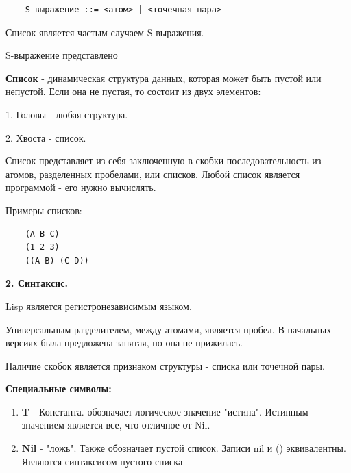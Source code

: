 \begin{lstlisting}
	S-выражение ::= <атом> | <точечная пара>
\end{lstlisting}

Список является частым случаем S-выражения.

S-выражение представлено 

\begin{figure}[ht!]
\end{figure}

\textbf{Список} - динамическая структура данных, которая может быть
пустой или непустой. Если она не пустая, то состоит из двух элементов:

1. Головы - любая структура.

2. Хвоста - список.

Список представляет из себя заключенную в скобки
последовательность из атомов, разделенных пробелами, или списков.
Любой список является программой - его нужно вычислять.

Примеры списков:
\begin{lstlisting}
	(A B C)
	(1 2 3)
	((A B) (C D))
\end{lstlisting}

\textbf{2. Синтаксис.}

Lisp является регистронезависимым языком. 

Универсальным разделителем, между атомами, является пробел. В начальных версиях была предложена запятая, но она не прижилась.

Наличие скобок является признаком структуры - списка или точечной пары.

\textbf{Специальные символы:}
\begin{enumerate}
	\item \textbf{T} - Константа. обозначает логическое значение "истина". Истинным значением является все, что отличное от Nil.
	\item \textbf{Nil} - "ложь". Также обозначает пустой список. Записи nil и () эквивалентны. Являются синтаксисом пустого списка
\end{enumerate}

